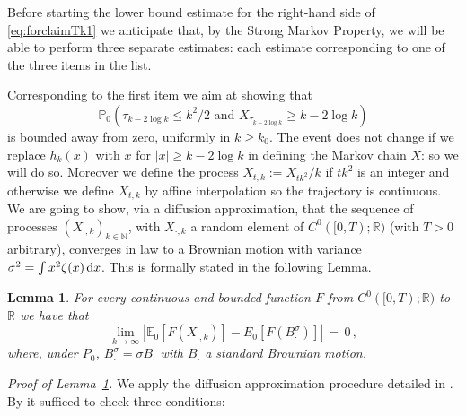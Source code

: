 \documentclass[reqno,11pt]{amsart}
\numberwithin{equation}{section}
\newtheorem{lemma}[theorem]{Lemma}
\newcommand{\dd}{\,\text{\rm d}}             %
\newcommand{\bbE}{{\ensuremath{\mathbb E}} }
\newcommand{\bbN}{{\ensuremath{\mathbb N}} }
\newcommand{\bbP}{{\ensuremath{\mathbb P}} }
\newcommand{\bbR}{{\ensuremath{\mathbb R}} }
\newcommand{\gz}{\zeta}
\newcommand{\gs}{\sigma}
\begin{document}
\medskip

Before starting the lower bound estimate for the right-hand side of
\eqref{eq:forclaimTk1}
we anticipate that, by the Strong Markov Property, 
we will be able to perform three separate estimates: each estimate  corresponding to one  of the three items in the list.
\smallskip 

Corresponding to the first item we aim at showing that 
\begin{equation}
\bbP_0\left( \tau_{k- 2 \log k} \le  k^2 /2  \textrm { and } X_{ \tau_{k- 2 \log k}} \ge  k- 2 \log k \right) 
\end{equation}
is bounded away from zero, uniformly in $k\ge k_0$. 
The event does not change if we replace $h_k(x)$ with $x$ for $\vert x \vert \ge k -2 \log k$ in defining the Markov chain $X$: so we will do so. Moreover  
we
define  the process 
$X_{t, k}:= X_{t k^2}/k$ if $ tk^2$ is an integer and otherwise we define $X_{t, k}$ by affine interpolation
so the trajectory is continuous.  We are going to show, via a  diffusion approximation,   that
the sequence of processes $( X_{\cdot, k})_{k \in \bbN}$, with $X_{\cdot, k}$ a random element 
of $C^0([0, T); \bbR)$ (with $T>0$ arbitrary), converges in law  to a Brownian motion with variance $\gs ^2=\int x^2 \gz (x) \dd x$. This is  formally stated in the following Lemma.

\medskip

\begin{lemma}
\label{th:SV}
For every continuous and bounded function 
$F$ from $C^0([0, T); \bbR)$ to $\bbR$ we have that 
\begin{equation}
\lim_{k \to \infty} 
\left \vert \bbE_0 \left[ F\left( X_{\cdot,k}\right)\right] - E_0 [ F(  B^\gs_\cdot)] \right\vert \, =\, 0\,,
\end{equation}
where, under $P_0$, $B^\gs _\cdot= \gs B_\cdot $ with $B_\cdot$ a standard  Brownian motion.
\end{lemma}
\medskip

\noindent
\emph{Proof of Lemma~\ref{th:SV}.}
We apply the diffusion approximation procedure detailed in 
 \cite[pp. 266--272]{StroockVaradhan}.  By  \cite[Assumptions (2.4)-(2.5)-(2.6), Theorem~11.2.3]{StroockVaradhan}  
it sufficed to check three conditions:
\smallskip
\end{document}
